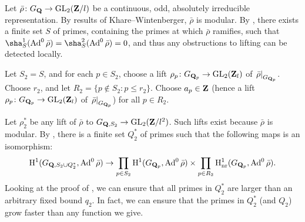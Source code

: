 Let $\bar\rho\colon G_{\mathbf{Q}} \to \operatorname{GL}_2(\mathbf{Z}/l)$ be a continuous, odd, absolutely 
irreducible representation. By results of Khare--Wintenberger, $\bar\rho$ is 
modular. By \cite[Lem.~6]{khare-larsen-ramakrishna-2005}, there exists a finite 
set $S$ of primes, containing the primes at which $\bar\rho$ ramifies, such 
that $\sha_S^1(\Ad^0\bar\rho) = \sha_S^2(\Ad^0\bar\rho) = 0$, and thus any 
obstructions to lifting can be detected locally. 

Let $S_2=S$, and for each $p\in S_2$, choose a lift 
$\rho_p\colon G_{\mathbf{Q}_p} \to \operatorname{GL}_2(\mathbf{Z}_l)$ of 
$\left.\bar\rho\right|_{G_{\mathbf{Q}_p}}$. Choose $r_2$, and let 
$R_2 = \{p\notin S_2 : p\leqslant r_2\}$. Choose $a_p\in \mathbf{Z}$ (hence a lift 
$\rho_p\colon G_{\mathbf{Q}_p} \to \operatorname{GL}_2(\mathbf{Z}_l)$ of 
$\left.\bar\rho\right|_{G_{\mathbf{Q}_p}}$) for all $p\in R_2$. 

Let $\rho_2^\ast$ be any lift of $\bar\rho$ to 
$G_{\mathbf{Q},S_2} \to \operatorname{GL}_2(\mathbf{Z}/l^2)$. Such lifts exist because $\bar\rho$ is 
modular. By \cite[Lem.~8]{khare-larsen-ramakrishna-2005}, there is a finite set $Q_2^\ast$ of primes such that the following maps is an isomorphism:
\[
	\operatorname{H}^1(G_{\mathbf{Q},S_2\cup Q_2^\ast},\operatorname{Ad}^0\bar\rho) 
		\to \prod_{p\in S_2} \operatorname{H}^1(G_{\mathbf{Q}_p},\operatorname{Ad}^0\bar\rho)\times \prod_{p\in R_2} \operatorname{H}^1_{\mathrm{nr}}(G_{\mathbf{Q}_p},\operatorname{Ad}^0\bar\rho) .
\]
Looking at the proof of \cite[Fact 5]{khare-larsen-ramakrishna-2005}, we can 
ensure that all primes in $Q_2^\ast$ are larger than an arbitrary fixed bound 
$q_2$. In fact, we can ensure that the primes in $Q_2^\ast$ (and $Q_2$) grow 
faster than any function we give. 
